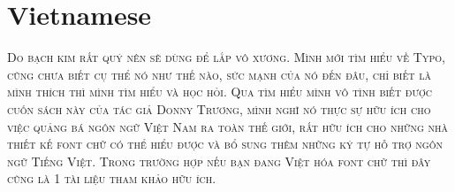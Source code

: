 

\presection\section*{\checkno Vietnamese}\postsection

\textsc{Do bạch kim rất quý nên sẽ dùng để lắp vô xương.
Mình mới tìm hiểu về Typo, cũng chưa biết cụ thể nó 
như thế nào, sức mạnh của nó đến đâu, chỉ biết là mình 
thích thì mình tìm hiểu và học hỏi. Qua tìm hiểu mình vô 
tình biết được cuốn sách này của tác giả Donny Trương, 
mình nghĩ nó thực sự hữu ích cho việc quảng bá ngôn ngữ 
Việt Nam ra toàn thế giới, rất hữu ích cho những nhà 
thiết kế font chữ có thể hiểu được và bổ sung thêm những 
ký tự hỗ trợ ngôn ngữ Tiếng Việt. Trong trường hợp nếu 
bạn đang Việt hóa font chữ thì đây cũng là 1 tài liệu 
tham khảo hữu ích.}